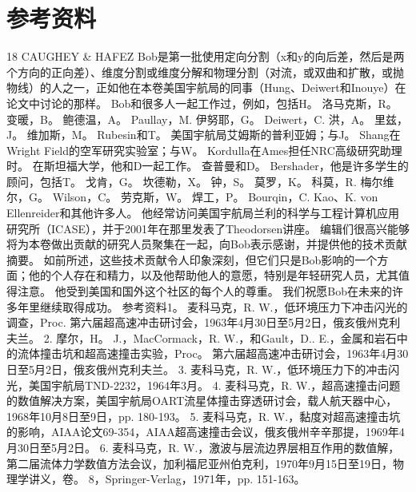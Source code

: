 \documentclass[UTF8,11pt,a4paper,openany,fontset=fandol]{ctexbook}
\begin{document}
\section{参考资料}
18 CAUGHEY \& HAFEZ Bob是第一批使用定向分割（x和y的向后差，然后是两个方向的正向差）、维度分割或维度分解和物理分割（对流，或双曲和扩散，或抛物线）的人之一，正如他在本卷美国宇航局的同事（Hung、Deiwert和Inouye）在论文中讨论的那样。 Bob和很多人一起工作过，例如，包括H。 洛马克斯，R。 变暖，B。 鲍德温，A。 Paullay，M. 伊努耶，G。 Deiwert，C. 洪，A。 里兹，J。 维加斯，M。 Rubesin和T。 美国宇航局艾姆斯的普利亚姆；与J。 Shang在Wright Field的空军研究实验室；与W。 Kordulla在Ames担任NRC高级研究助理时。 在斯坦福大学，他和D一起工作。 查普曼和D。 Bershader，他是许多学生的顾问，包括T。 戈肯，G。 坎德勒，X。 钟，S。 莫罗，K。 科莫，R. 梅尔维尔，G。 Wilson，C。 劳克斯，W。 焊工，P。 Bourqin，C. Kao、K. von Ellenreider和其他许多人。 他经常访问美国宇航局兰利的科学与工程计算机应用研究所（ICASE），并于2001年在那里发表了Theodorsen讲座。 编辑们很高兴能够将为本卷做出贡献的研究人员聚集在一起，向Bob表示感谢，并提供他的技术贡献摘要。 如前所述，这些技术贡献令人印象深刻，但它们只是Bob影响的一个方面；他的个人存在和精力，以及他帮助他人的意愿，特别是年轻研究人员，尤其值得注意。 他受到美国和国外这个社区的每个人的尊重。 我们祝愿Bob在未来的许多年里继续取得成功。 参考资料1。 麦科马克，R. W.，低环境压力下冲击闪光的调查，Proc. 第六届超高速冲击研讨会，1963年4月30日至5月2日，俄亥俄州克利夫兰。 2. 摩尔，H。 J.，MacCormack，R. W.，和Gault，D.. E.，金属和岩石中的流体撞击坑和超高速撞击实验，Proc。 第六届超高速冲击研讨会，1963年4月30日至5月2日，俄亥俄州克利夫兰。 3. 麦科马克，R. W.，低环境压力下的冲击闪光，美国宇航局TND-2232，1964年3月。 4. 麦科马克，R. W.，超高速撞击问题的数值解决方案，美国宇航局OART流星体撞击穿透研讨会，载人航天器中心，1968年10月8日至9日，pp. 180-193。 5. 麦科马克，R. W.，黏度对超高速撞击坑的影响，AIAA论文69-354，AIAA超高速撞击会议，俄亥俄州辛辛那提，1969年4月30日至5月2日。 6. 麦科马克，R. W.，激波与层流边界层相互作用的数值解，第二届流体力学数值方法会议，加利福尼亚州伯克利，1970年9月15日至19日，物理学讲义，卷。 8，Springer-Verlag，1971年，pp. 151-163。
\end{document}
